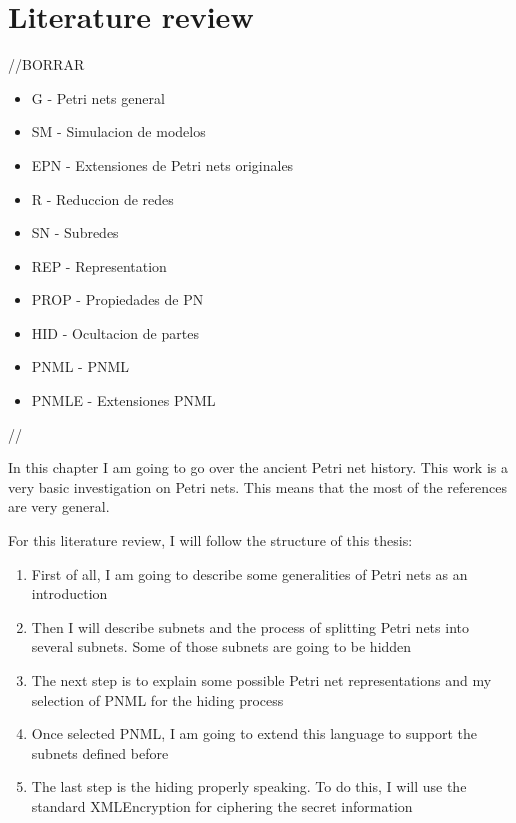 
\chapter{Literature review} %

\label{LiteratureReview} %


//BORRAR

\begin{itemize}
 \item G - Petri nets general
 \item SM - Simulacion de modelos
 \item EPN - Extensiones de Petri nets originales
 \item R - Reduccion de redes
 \item SN - Subredes
 \item REP - Representation
 \item PROP - Propiedades de PN
 \item HID - Ocultacion de partes
 \item PNML - PNML
 \item PNMLE - Extensiones PNML

\end{itemize}

//

In this chapter I am going to go over the ancient Petri net history. 
This work is a very basic investigation 
on Petri nets. This means that the most of the references are very general.

For this literature review, I will follow the structure of this thesis:

\begin{enumerate}
\item First of all, I am going to describe some generalities of Petri nets
as an introduction\item Then I will describe subnets and the process of splitting Petri nets
into several subnets. Some of those subnets are going to be hidden 
\item The next step is to explain some possible Petri net representations
and my selection of PNML for the hiding process
\item Once selected PNML, I am going to extend this language to support the
subnets defined before
\item The last step is the hiding properly speaking. To do this, I will use the standard XMLEncryption for ciphering the secret information
\end{enumerate}

